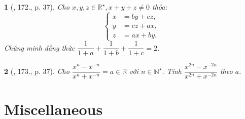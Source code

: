 \documentclass{article}
\newtheorem{baitoan}{}
\begin{document}
\begin{baitoan}[\cite{Tuyen_Toan_8}, 172., p. 37]
	Cho $x,y,z\in\mathbb{R}^\star,x + y + z\ne0$ thỏa:
	\begin{equation*}
		\left\{\begin{split}
			x &= by + cz,\\
			y &= cz + ax,\\
			z &= ax + by.
		\end{split}\right.
	\end{equation*}
	Chứng minh đẳng thức $\dfrac{1}{1 + a} + \dfrac{1}{1 + b} + \dfrac{1}{1 + c} = 2$.
\end{baitoan}

\begin{baitoan}[\cite{Tuyen_Toan_8}, 173., p. 37]
	Cho $\dfrac{x^n - x^{-n}}{x^n + x^{-n}} = a\in\mathbb{R}$ với $n\in\mathbb{N}^\star$. Tính $\dfrac{x^{2n} - x^{-2n}}{x^{2n} + x^{-2n}}$ theo $a$.
\end{baitoan}


\section{Miscellaneous}


\printbibliography[heading=bibintoc]
	
\end{document}
